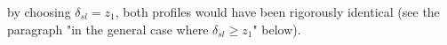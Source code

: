 by choosing $\delta_{sl}=z_1$, both profiles would have been
rigorously identical
(see the paragraph "in the general case where
$\delta_{sl} \geq z_1$" below).
